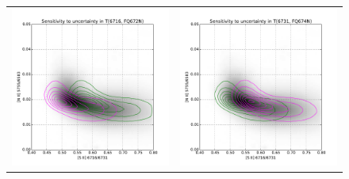 \documentclass[preprint]{aastex}
\begin{document}
\begin{figure}
  \centering
  \setlength\tabcolsep{0pt}
  \begin{tabular}{ll}
    \includegraphics{ratio-sensitivity-T6716-FQ672N} &
    \includegraphics{ratio-sensitivity-T6731-FQ674N} \\

\end{tabular}
\end{figure}
\end{document}
